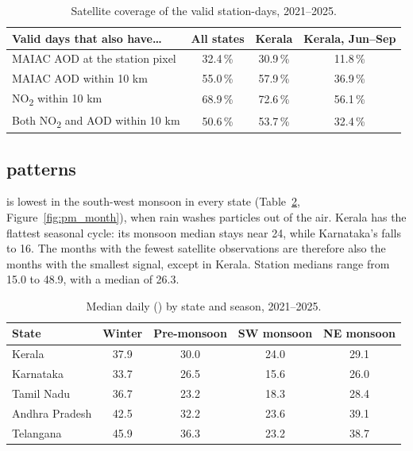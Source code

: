 \begin{table}[!htbp]
    \centering
    \small
    \begin{tabular}{l|c|c|c}
        \hline
        Valid \pmtf{} days that also have\ldots & All states & Kerala & Kerala, Jun--Sep \\
        \hline
        MAIAC AOD at the station pixel & 32.4\,\% & 30.9\,\% & 11.8\,\% \\
        MAIAC AOD within 10 km & 55.0\,\% & 57.9\,\% & 36.9\,\% \\
        NO\textsubscript{2} within 10 km & 68.9\,\% & 72.6\,\% & 56.1\,\% \\
        Both NO\textsubscript{2} and AOD within 10 km & 50.6\,\% & 53.7\,\% & 32.4\,\% \\
        \hline
    \end{tabular}
    \caption{Satellite coverage of the valid \pmtf{} station-days, 2021--2025.}
    \label{tab:feasibility}
\end{table}

\subsection{\texorpdfstring{\pmtf{}}{PM2.5} patterns}

\pmtf{} is lowest in the south-west monsoon in every state (Table~\ref{tab:season},
Figure~\ref{fig:pm_month}), when rain washes particles out of the air. Kerala has the flattest
seasonal cycle: its monsoon median stays near 24\ugm{}, while Karnataka's falls to 16\ugm{}. The
months with the fewest satellite observations are therefore also the months with the smallest
\pmtf{} signal, except in Kerala. Station medians range from 15.0 to 48.9\ugm{}, with a median of
26.3\ugm{}.

\begin{table}[!htbp]
    \centering
    \small
    \begin{tabular}{l|c|c|c|c}
        \hline
        State & Winter & Pre-monsoon & SW monsoon & NE monsoon \\
        \hline
        Kerala & 37.9 & 30.0 & 24.0 & 29.1 \\
        Karnataka & 33.7 & 26.5 & 15.6 & 26.0 \\
        Tamil Nadu & 36.7 & 23.2 & 18.3 & 28.4 \\
        Andhra Pradesh & 42.5 & 32.2 & 23.6 & 39.1 \\
        Telangana & 45.9 & 36.3 & 23.2 & 38.7 \\
        \hline
    \end{tabular}
    \caption{Median daily \pmtf{} (\ugm{}) by state and season, 2021--2025.}
    \label{tab:season}
\end{table}

